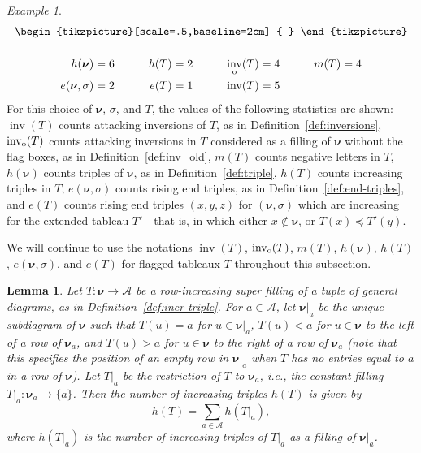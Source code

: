 \documentclass[12pt]{amsart}
\newtheorem{lemma}[thm]{Lemma}
\theoremstyle{definition}
\theoremstyle{remark}
\newtheorem{example}[thm]{Example}
\newcommand{\nubold}{{\boldsymbol \nu }}
\newcommand{\Acal}{{\mathcal A}}
\newcommand{\sgnle}{\preccurlyeq}
\DeclareMathOperator{\inv}{inv}
\newcommand{\oinv}{\inv _{{\rm o}}}
\begin{document}
\begin{example}
\begin{gather*}
\begin{tikzpicture}[scale=.5,baseline=2cm]
{    }
\end{tikzpicture}
\\[3ex]
\begin{aligned}
h(\nubold) & = 6  & \qquad h(T) & = 2 & \qquad  \oinv (T) & = 4
 & \qquad m(T) & = 4 \\
e(\nubold,\sigma) & = 2 & e(T) & = 1 & \inv(T) & = 5
\end{aligned}
\end{gather*}
For this choice of $\nubold $, $\sigma $, and $T$, the values of the
following statistics are shown: $\inv(T)$ counts attacking inversions
of $T$, as in Definition~\ref{def:inversions}, $\oinv (T)$ counts
attacking inversions in $T$ considered as a filling of $\nubold $
without the flag boxes, as in Definition~\ref{def:inv_old}, $m(T)$
counts negative letters in $T$, $h(\nubold)$ counts triples of
$\nubold$, as in Definition~\ref{def:triple}, $h(T)$ counts increasing
triples in $T$, $e(\nubold ,\sigma )$ counts rising end triples, as in
Definition~\ref{def:end-triples}, and $e(T)$ counts rising end triples
$(x,y,z)$ for $(\nubold ,\sigma )$ which are increasing for the
extended tableau $T'$---that is, in which either $x\not \in \nubold $,
or $T(x) \sgnle T'(y)$.
\end{example}

We will continue to use the notations $\inv (T)$, $\oinv (T)$, $m(T)$,
$h(\nubold )$, $h(T)$, $e(\nubold ,\sigma )$, and $e(T)$ for flagged
tableaux $T$ throughout this subsection.

\begin{lemma}\label{lem:incr-triples}
Let $T\colon \nubold \rightarrow \Acal $ be a row-increasing super
filling of a tuple of general diagrams, as in
Definition~\ref{def:incr-triple}.  For $a\in \Acal$, let $\nubold
|_{a}$ be the unique subdiagram of $\nubold $ such that $T(u) = a$ for
$u \in \nubold |_{a}$, $T(u)<a$ for $u\in \nubold $ to the left of a
row of $\nubold _{a}$, and $T(u)>a$ for $u\in \nubold $ to the right
of a row of $\nubold _{a}$ (note that this specifies the position of
an empty row in $\nubold |_{a}$ when $T$ has no entries equal to $a$
in a row of $\nubold $).  Let $T|_{a}$ be the restriction of $T$ to
$\nubold _{a}$, i.e., the constant filling $T|_{a}\colon \nubold
_{a}\rightarrow \{a \}$.  Then the number of increasing triples $h(T)$
is given by
\begin{equation}\label{e:incr-triples1}
h(T) = \sum _{a\in \Acal } h(T|_{a}),
\end{equation}
where $h(T|_{a})$ is the number of increasing triples of $T|_{a}$ as a
filling of $\nubold |_{a}$.
\end{lemma}
\end{document}

